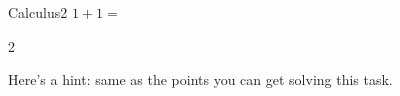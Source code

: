 \begin{question}{Calculus}{2}
$1+1=$ 
\end{question}%
\begin{answer}
2
\end{answer}


\begin{hint}
Here's a hint: same as the points you can get solving this task.
\end{hint}